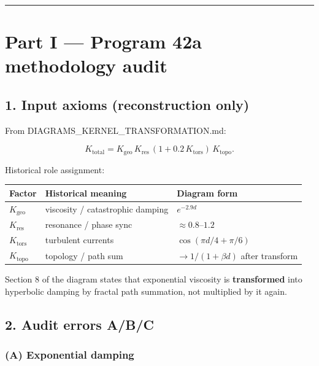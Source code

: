 \documentclass[11pt,a4paper,openany]{report}
\begin{document}
\par\medskip\hrule\medskip

\chapter{Part I — Program 42a methodology audit}

\section{1. Input axioms (reconstruction only)}

From DIAGRAMS\_KERNEL\_TRANSFORMATION.md:

\[
K_{\mathrm{total}}
=
K_{\mathrm{geo}}\,K_{\mathrm{res}}\,(1+0.2\,K_{\mathrm{tors}})\,K_{\mathrm{topo}}.
\]

Historical role assignment:

\begin{center}
\begingroup\small
\setlength{\tabcolsep}{3.5pt}
\renewcommand{\arraystretch}{1.16}
\begin{longtable}{@{}p{}p{}p{}@{}}
\toprule
\textbf{Factor} & \textbf{Historical meaning} & \textbf{Diagram form} \\
\midrule
\endhead
\(K_{\mathrm{geo}}\) & viscosity /\allowbreak{} catastrophic damping & \(e^{-2.9d}\) \\
\(K_{\mathrm{res}}\) & resonance /\allowbreak{} phase sync & \(\approx 0.8\)–\(1.2\) \\
\(K_{\mathrm{tors}}\) & turbulent currents & \(\cos(\pi d/4+\pi/6)\) \\
\(K_{\mathrm{topo}}\) & topology /\allowbreak{} path sum & \(\to 1/(1+\beta d)\) after transform \\
\bottomrule
\end{longtable}
\endgroup
\end{center}

Section 8 of the diagram states that exponential viscosity is \textbf{transformed} into hyperbolic damping by fractal path summation, not multiplied by it again.

\section{2. Audit errors A/\allowbreak{}B/\allowbreak{}C}

\subsection{(A) Exponential damping}
\end{document}
